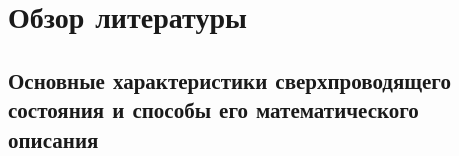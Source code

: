 \chapter{Обзор литературы}



\section{Основные характеристики сверхпроводящего состояния и способы его 
математического описания}

